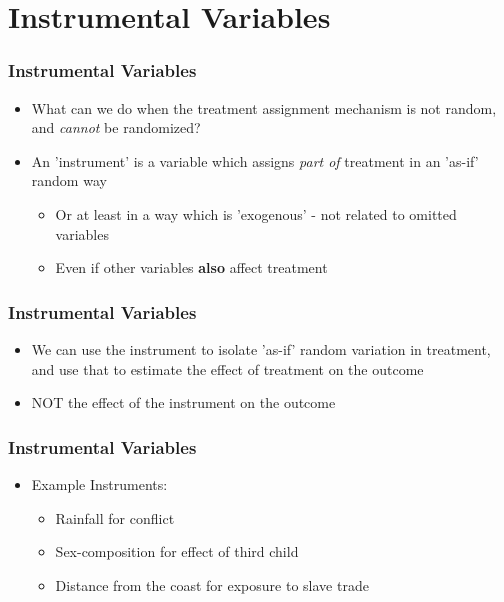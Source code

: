 \documentclass[xcolor=x11names,compress]{beamer}\usepackage[]{graphicx}\usepackage[]{color}
\renewcommand{\(}{\begin{columns}}
\renewcommand{\)}{\end{columns}}
\newcommand{\<}[1]{\begin{column}{#1}}
\renewcommand{\>}{\end{column}}
\begin{document}
\section{Instrumental Variables}

\begin{frame}
\frametitle{Instrumental Variables}
\begin{itemize}
\item What can we do when the treatment assignment mechanism is not random, and \textit{cannot} be randomized?
\pause
\item An 'instrument' is a variable which assigns \textit{part of} treatment in an 'as-if' random way
\pause
\begin{itemize}
\item Or at least in a way which is 'exogenous' - not related to omitted variables
\item Even if other variables \textbf{also} affect treatment
\end{itemize}
\end{itemize}
\end{frame}

\begin{frame}
\frametitle{Instrumental Variables}
\begin{itemize}
\item We can use the instrument to isolate 'as-if' random variation in treatment, and use that to estimate the effect of treatment on the outcome
\pause
\item NOT the effect of the instrument on the outcome
\end{itemize}
\end{frame}

\begin{frame}
\frametitle{Instrumental Variables}
\begin{itemize}
\item Example Instruments:
\begin{itemize}
\item Rainfall for conflict 
\item Sex-composition for effect of third child
\item Distance from the coast for exposure to slave trade
\end{itemize}
\end{itemize}
\end{frame}
\end{document}
